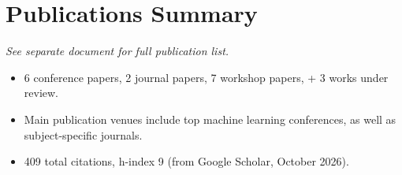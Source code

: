 \ifseparatepublist
\section*{Publications Summary}
\textit{See separate document for full publication list.}

\fi
\begin{itemize}
    \item 6 conference papers, 2 journal papers, 7 workshop papers, + 3 works under review.
    \item Main publication venues include top machine learning conferences, as well as subject-specific journals.
    \item 409 total citations, h-index 9 (from Google Scholar, October 2026).
\end{itemize}
